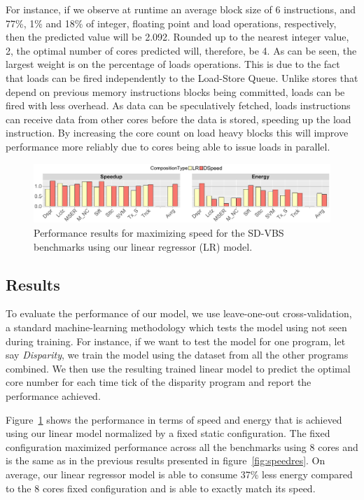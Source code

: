 For instance, if we observe at runtime an average block size of 6 instructions, and 77\%, 1\% and 18\% of integer, floating point and load operations, respectively, then the predicted value will be 2.092.
Rounded up to the nearest integer value, 2, the optimal number of cores predicted will, therefore, be 4.
As can be seen, the largest weight is on the percentage of loads operations.
This is due to the fact that loads can be fired independently to the Load-Store Queue.
Unlike stores that depend on previous memory instructions blocks being committed, loads can be fired with less overhead.
As data can be speculatively fetched, loads instructions can receive data from other cores before the data is stored, speeding up the load instruction.
By increasing the core count on load heavy blocks this will improve performance more reliably due to cores being able to issue loads in parallel.

\begin{figure}[t]
    \centering
	\includegraphics[width=1\textwidth]{graphics/results/lr_speed.pdf}
\vspace*{-8mm}
    \caption{Performance results for maximizing speed for the SD-VBS benchmarks using our linear regressor (LR) model.}%
    \label{fig:speedlr}
\vspace{5mm}
\end{figure}
\subsection{Results}

To evaluate the performance of our model, we use leave-one-out cross-validation, a standard machine-learning methodology which tests the model using not seen during training.
For instance, if we want to test the model for one program, let say \textit{Disparity}, we train the model using the dataset from all the other programs combined.
We then use the resulting trained linear model to predict the optimal core number for each time tick of the disparity program and report the performance achieved.

Figure~\ref{fig:speedlr} shows the performance in terms of speed and energy that is achieved using our linear model normalized by a fixed static configuration.
The fixed configuration maximized performance across all the benchmarks using 8 cores and is the same as in the previous results presented in figure~\ref{fig:speedres}.
On average, our linear regressor model is able to consume 37\% less energy compared to the 8 cores fixed configuration and is able to exactly match its speed.


